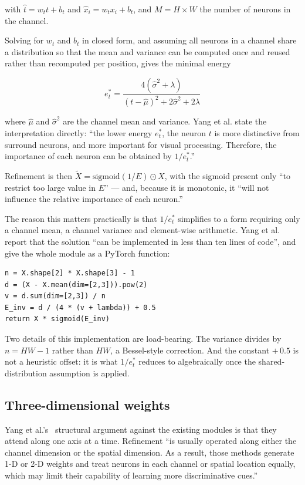 with $\hat{t} = w_t t + b_t$ and $\hat{x}_i = w_t x_i + b_t$, and $M = H \times W$ the number of neurons in the channel.

Solving for $w_t$ and $b_t$ in closed form, and assuming all neurons in a channel share a distribution so that the mean and variance can be computed once and reused rather than recomputed per position, gives the minimal energy

\[
	e_t^* = \frac{4(\hat{\sigma}^2 + \lambda)}{(t - \hat{\mu})^2 + 2\hat{\sigma}^2 + 2\lambda}
\]

where $\hat{\mu}$ and $\hat{\sigma}^2$ are the channel mean and variance. Yang et al. state the interpretation directly: ``the lower energy $e_t^*$, the neuron $t$ is more distinctive from surround neurons, and more important for visual processing. Therefore, the importance of each neuron can be obtained by $1/e_t^*$.''

Refinement is then $\tilde{X} = \text{sigmoid}(1/E) \odot X$, with the sigmoid present only ``to restrict too large value in $E$'' --- and, because it is monotonic, it ``will not influence the relative importance of each neuron.''

The reason this matters practically is that $1/e_t^*$ simplifies to a form requiring only a channel mean, a channel variance and element-wise arithmetic. Yang et al. report that the solution ``can be implemented in less than ten lines of code'', and give the whole module as a PyTorch function:

\begin{verbatim}
n = X.shape[2] * X.shape[3] - 1
d = (X - X.mean(dim=[2,3])).pow(2)
v = d.sum(dim=[2,3]) / n
E_inv = d / (4 * (v + lambda)) + 0.5
return X * sigmoid(E_inv)
\end{verbatim}

Two details of this implementation are load-bearing. The variance divides by $n = HW - 1$ rather than $HW$, a Bessel-style correction. And the constant $+\,0.5$ is not a heuristic offset: it is what $1/e_t^*$ reduces to algebraically once the shared-distribution assumption is applied.

\subsection{Three-dimensional weights}
\label{sec:simam-3d-weights}

Yang et al.'s~\cite{yang2021} structural argument against the existing modules is that they attend along one axis at a time. Refinement ``is usually operated along either the channel dimension or the spatial dimension. As a result, those methods generate 1-D or 2-D weights and treat neurons in each channel or spatial location equally, which may limit their capability of learning more discriminative cues.''

